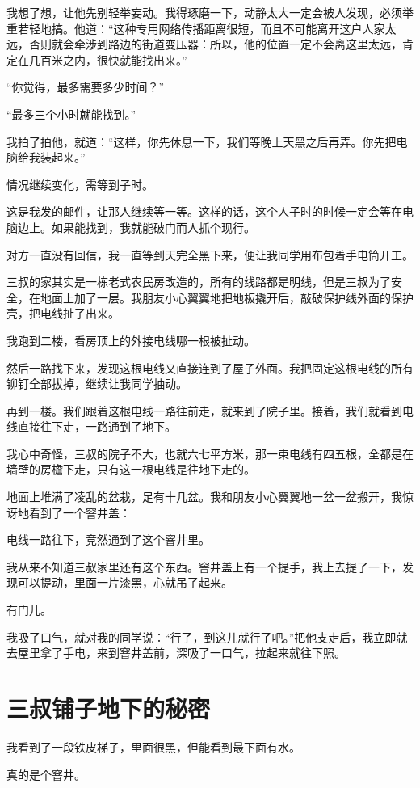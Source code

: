 我想了想，让他先别轻举妄动。我得琢磨一下，动静太大一定会被人发现，必须举重若轻地搞。他道：“这种专用网络传播距离很短，而且不可能离开这户人家太远，否则就会牵涉到路边的街道变压器：所以，他的位置一定不会离这里太远，肯定在几百米之内，很快就能找出来。”

“你觉得，最多需要多少时间？”

“最多三个小时就能找到。”

我拍了拍他，就道：“这样，你先休息一下，我们等晚上天黑之后再弄。你先把电脑给我装起来。”

情况继续变化，需等到子时。

这是我发的邮件，让那人继续等一等。这样的话，这个人子时的时候一定会等在电脑边上。如果能找到，我就能破门而人抓个现行。

对方一直没有回信，我一直等到天完全黑下来，便让我同学用布包着手电筒开工。

三叔的家其实是一栋老式农民房改造的，所有的线路都是明线，但是三叔为了安全，在地面上加了一层。我朋友小心翼翼地把地板撬开后，敲破保护线外面的保护壳，把电线扯了出来。

我跑到二楼，看房顶上的外接电线哪一根被扯动。

然后一路找下来，发现这根电线又直接连到了屋子外面。我把固定这根电线的所有铆钉全部拔掉，继续让我同学抽动。

再到一楼。我们跟着这根电线一路往前走，就来到了院子里。接着，我们就看到电线直接往下走，一路通到了地下。

我心中奇怪，三叔的院子不大，也就六七平方米，那一束电线有四五根，全都是在墙壁的房檐下走，只有这一根电线是往地下走的。

地面上堆满了凌乱的盆栽，足有十几盆。我和朋友小心翼翼地一盆一盆搬开，我惊讶地看到了一个窨井盖：

电线一路往下，竞然通到了这个窨井里。

我从来不知道三叔家里还有这个东西。窨井盖上有一个提手，我上去提了一下，发现可以提动，里面一片漆黑，心就吊了起来。

有门儿。

我吸了口气，就对我的同学说：“行了，到这儿就行了吧。”把他支走后，我立即就去屋里拿了手电，来到窨井盖前，深吸了一口气，拉起来就往下照。

\chapter{三叔铺子地下的秘密}

我看到了一段铁皮梯子，里面很黑，但能看到最下面有水。

真的是个窨井。

